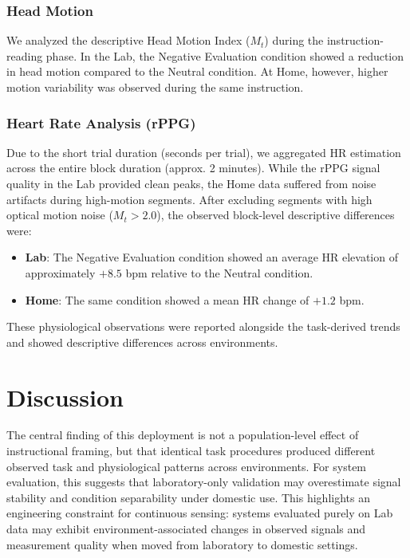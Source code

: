 \documentclass[dvipdfmx]{ehis}
\begin{document}
\subsubsection{Head Motion}
We analyzed the descriptive Head Motion Index ($M_t$) during the instruction-reading phase.
In the Lab, the Negative Evaluation condition showed a reduction in head motion compared to the Neutral condition. At Home, however, higher motion variability was observed during the same instruction.

\subsubsection{Heart Rate Analysis (rPPG)}
Due to the short trial duration (seconds per trial), we aggregated HR estimation across the entire block duration (approx. 2 minutes).
While the rPPG signal quality in the Lab provided clean peaks, the Home data suffered from noise artifacts during high-motion segments.
After excluding segments with high optical motion noise ($M_t > 2.0$), the observed block-level descriptive differences were:
\begin{itemize}
    \item \textbf{Lab}: The Negative Evaluation condition showed an average HR elevation of approximately $+8.5$ bpm relative to the Neutral condition.
    \item \textbf{Home}: The same condition showed a mean HR change of $+1.2$ bpm.
\end{itemize}
These physiological observations were reported alongside the task-derived trends and showed descriptive differences across environments.

\section{Discussion}

The central finding of this deployment is not a population-level effect of instructional framing, but that identical task procedures produced different observed task and physiological patterns across environments. For system evaluation, this suggests that laboratory-only validation may overestimate signal stability and condition separability under domestic use. This highlights an engineering constraint for continuous sensing: systems evaluated purely on Lab data may exhibit environment-associated changes in observed signals and measurement quality when moved from laboratory to domestic settings.
\end{document}
